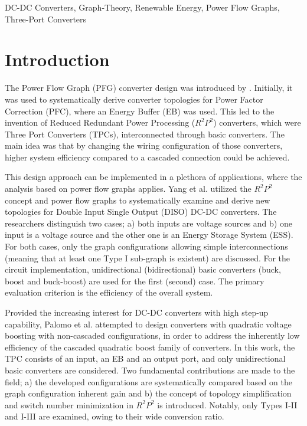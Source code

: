 \documentclass[conference]{IEEEtran}
\begin{document}
\begin{IEEEkeywords}
DC-DC Converters, Graph-Theory, Renewable Energy, Power Flow Graphs, Three-Port Converters
\end{IEEEkeywords}

\section{Introduction}
The Power Flow Graph (PFG) converter design was introduced by \cite{tse_theoretical_2000}. Initially, it was used to systematically derive converter topologies for Power Factor Correction (PFC), where an Energy Buffer (EB) was used. This led to the invention of Reduced Redundant Power Processing ($R^2P^2$) converters, which were Three Port Converters (TPCs), interconnected through basic converters. The main idea was that by changing the wiring configuration of those converters, higher system efficiency compared to a cascaded connection could be achieved. 

This design approach can be implemented in a plethora of applications, where the analysis based on power flow graphs applies. Yang et al. \cite{yang_synthesis_2015} utilized the $R^2P^2$ concept and power flow graphs to systematically examine and derive new topologies for Double Input Single Output (DISO) DC-DC converters. The researchers distinguish two cases; a) both inputs are voltage sources and b) one input is a voltage source and the other one is an Energy Storage System (ESS). For both cases, only the graph configurations allowing simple interconnections (meaning that at least one Type I sub-graph is existent) are discussed. For the circuit implementation, unidirectional (bidirectional) basic converters (buck, boost and buck-boost) are used for the first (second) case. The primary evaluation criterion is the efficiency of the overall system. 

Provided the increasing interest for DC-DC converters with high step-up capability, Palomo et al. \cite{loera-palomo_family_2015} 
attempted to design converters with quadratic voltage boosting with non-cascaded configurations, in order to address the inherently low efficiency of the cascaded quadratic boost family of converters. In this work, the TPC consists of an input, an EB and an output port, and only unidirectional basic converters are considered. Two fundamental contributions are made to the field; a) the developed configurations are systematically compared based on the graph configuration inherent gain and b) the concept of topology simplification and switch number minimization in $R^2P^2$ is introduced. Notably, only Types I-II and I-III are examined, owing to their wide conversion ratio.
\end{document}
